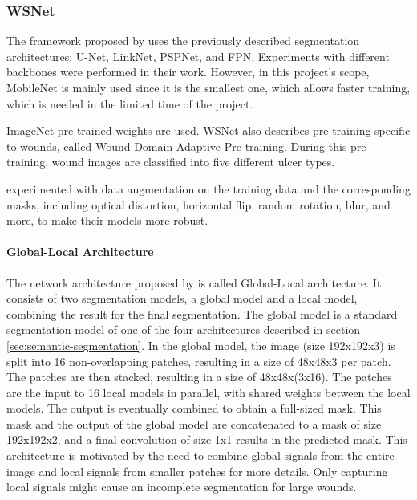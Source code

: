 \subsubsection{WSNet}

The framework proposed by \citeauthor{Oota_2023_WACV} uses the previously described segmentation architectures: U-Net, LinkNet, PSPNet, and FPN. Experiments with different backbones were performed in their work. However, in this project's scope, MobileNet \cite{howard2017mobilenets} is mainly used since it is the smallest one, which allows faster training, which is needed in the limited time of the project.

ImageNet pre-trained weights are used. WSNet also describes pre-training specific to wounds, called Wound-Domain Adaptive Pre-training. During this pre-training, wound images are classified into five different ulcer types.

\citeauthor{Oota_2023_WACV} experimented with data augmentation on the training data and the corresponding masks, including optical distortion, horizontal flip, random rotation, blur, and more, to make their models more robust.

\paragraph{Global-Local Architecture}

The network architecture proposed by \citeauthor{Oota_2023_WACV} is called Global-Local architecture. It consists of two segmentation models, a global model and a local model, combining the result for the final segmentation. The global model is a standard segmentation model of one of the four architectures described in section \ref{sec:semantic-segmentation}. In the global model, the image (size 192x192x3) is split into 16 non-overlapping patches, resulting in a size of 48x48x3 per patch. The patches are then stacked, resulting in a size of 48x48x(3x16). The patches are the input to 16 local models in parallel, with shared weights between the local models. The output is eventually combined to obtain a full-sized mask. This mask and the output of the global model are concatenated to a mask of size 192x192x2, and a final convolution of size 1x1 results in the predicted mask. This architecture is motivated by the need to combine global signals from the entire image and local signals from smaller patches for more details. Only capturing local signals might cause an incomplete segmentation for large wounds. \cite{Oota_2023_WACV}

